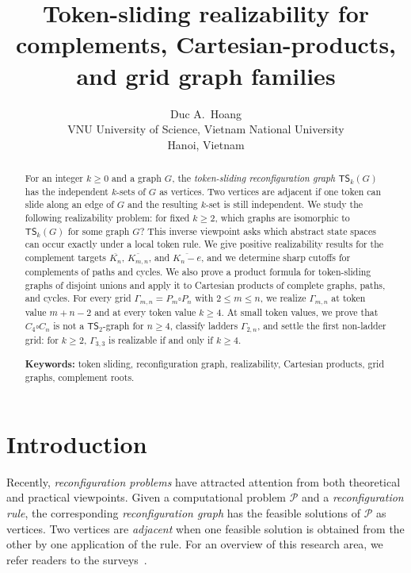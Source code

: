 \documentclass[a4paper]{article}
\title{\textbf{Token-sliding realizability for complements, Cartesian-products, and grid graph families}}
\author{Duc A.\ Hoang\\
VNU University of Science, Vietnam National University\\
Hanoi, Vietnam\\
\email{hoanganhduc@hus.edu.vn}}
\date{}
\theoremstyle{plain}
\theoremstyle{definition}
\numberwithin{equation}{section}
\begin{document}
\maketitle

\begin{abstract}
For an integer $k\ge 0$ and a graph $G$, the \emph{token-sliding reconfiguration graph $\mathsf{TS}_k(G)$} has the independent $k$-sets of $G$ as vertices.
Two vertices are adjacent if one token can slide along an edge of $G$ and the resulting $k$-set is still independent.
We study the following realizability problem: for fixed $k\ge 2$, which graphs are isomorphic to $\mathsf{TS}_k(G)$ for some graph $G$?
This inverse viewpoint asks which abstract state spaces can occur exactly under a local token rule.
We give positive realizability results for the complement targets $\overline{K_n}$, $\overline{K_{m,n}}$, and $\overline{K_n-e}$, and we determine sharp cutoffs for complements of paths and cycles.
We also prove a product formula for token-sliding graphs of disjoint unions and apply it to Cartesian products of complete graphs, paths, and cycles.
For every grid $\Gamma_{m,n}=P_m\square P_n$ with $2\le m\le n$, we realize $\Gamma_{m,n}$ at token value $m+n-2$ and at every token value $k\ge 4$.
At small token values, we prove that $C_4\square C_n$ is not a $\mathsf{TS}_2$-graph for $n\ge 4$, classify ladders $\Gamma_{2,n}$, and settle the first non-ladder grid: for $k\ge 2$, $\Gamma_{3,3}$ is realizable if and only if $k\ge 4$.

\noindent\textbf{Keywords:} token sliding, reconfiguration graph, realizability, Cartesian products, grid graphs, complement roots.
\end{abstract}

\section{Introduction}

Recently, \emph{reconfiguration problems} have attracted attention from both theoretical and practical viewpoints.
Given a computational problem $\mathcal{P}$ and a \emph{reconfiguration rule}, the corresponding \emph{reconfiguration graph} has the feasible solutions of $\mathcal{P}$ as vertices.
Two vertices are \emph{adjacent} when one feasible solution is obtained from the other by one application of the rule.
For an overview of this research area, we refer readers to the surveys~\cite{Nishimura2018,vandenHeuvel2013,MynhardtN2019,BousquetMNS2024}.
\end{document}
